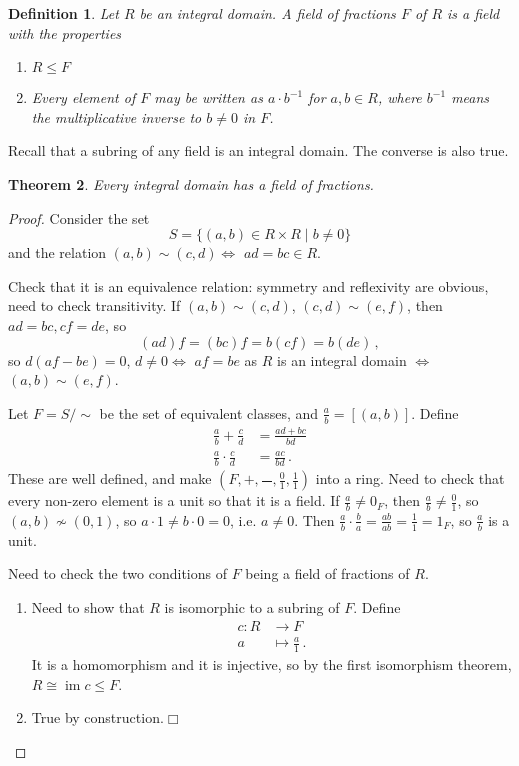 \documentclass{article}
\theoremstyle{plain}\theoremheaderfont{\normalfont\itshape}\theorembodyfont{\rmfamily}\theoremseparator{.}\newtheorem*{rem}{Remark}\newtheorem*{ex}{Example}\newtheorem*{proof}{Proof}\newtheorem*{altp}{Alternative proof}\newtheorem*{nonex}{Non-Example}
\theoremstyle{plain}\theoremheaderfont{\normalfont\bfseries}\theorembodyfont{\rmfamily}\theoremseparator{.}\newtheorem{thm}{Theorem}[section]\newtheorem{lem}[thm]{Lemma}\newtheorem{prop}[thm]{Proposition}\newtheorem*{cor}{Corollary}\newtheorem{defn}[thm]{Definition}\newtheorem{clm}[thm]{Claim}\newtheorem{clminproof}{Claim}\newtheorem*{notn}{Notation}\newtheorem*{exer}{Exercise}\newtheorem*{lemnn}{Lemma}
\theoremstyle{break}\theoremheaderfont{\normalfont\itshape}\theorembodyfont{\rmfamily}\theoremseparator{.\medskip}\newtheorem*{proofskip}{Proof}\newtheorem*{exs}{Examples}\newtheorem*{rems}{Remarks}\newtheorem*{obs}{Observations}
\theoremstyle{break}\theoremheaderfont{\normalfont\bfseries}\theorembodyfont{\rmfamily}\theoremseparator{.\medskip}\newtheorem{lemskip}[thm]{Lemma}\newtheorem{defnskip}[thm]{Definition}\newtheorem{propskip}[thm]{Proposition}\newtheorem{thmskip}[thm]{Theorem}
\numberwithin{equation}{section}
\newcommand{\qed}{\hfill\ensuremath{\Box}}
\DeclareMathOperator*{\im}{im}
\begin{document}
    \begin{defn}
        Let \(R\) be an integral domain. A \textit{field of fractions} \(F\) of \(R\) is a field with the properties
        \begin{enumerate}[topsep=0pt,label=(\roman*)]
            \item \(R\le F\)
            \item Every element of \(F\) may be written as \(a\cdot b^{-1}\) for \(a,b\in R\), where \(b^{-1}\) means the multiplicative inverse to \(b\ne 0\) in \(F\).
        \end{enumerate}
    \end{defn}

    Recall that a subring of any field is an integral domain. The converse is also true.
    \begin{thm}
        Every integral domain has a field of fractions.
    \end{thm}
    \begin{proof}
        Consider the set
        \[S=\{(a,b)\in R\times R\mid b\ne 0\}\]
        and the relation \((a,b)\sim(c,d)\iff\) \(ad=bc\in R\).

        Check that it is an equivalence relation: symmetry and reflexivity are obvious, need to check transitivity. If \((a,b)\sim(c,d)\), \((c,d)\sim(e,f)\), then \(ad=bc,cf=de\), so
        \[(ad)f=(bc)f=b(cf)=b(de)\,,\]
        so \(d(af-be)=0\), \(d\ne 0\iff\) \(af=be\) as \(R\) is an integral domain \(\iff\) \((a,b)\sim (e,f)\).

        Let \(F=S/\sim\) be the set of equivalent classes, and \(\frac{a}{b}=[(a,b)]\). Define
        \begin{align*}
            \frac{a}{b}+\frac{c}{d}&=\frac{ad+bc}{bd}\\
            \frac{a}{b}\cdot\frac{c}{d}&=\frac{ac}{bd}\,.
        \end{align*}
        These are well defined, and make \((F,+,\frac{\quad}{\quad},\frac{0}{1},\frac{1}{1})\) into a ring. Need to check that every non-zero element is a unit so that it is a field. If \(\frac{a}{b}\ne 0_F\), then \(\frac{a}{b}\ne\frac{0}{1}\), so \((a,b)\not\sim (0,1)\), so \(a\cdot 1\ne b\cdot 0=0\), i.e. \(a\ne 0\). Then \(\frac{a}{b}\cdot\frac{b}{a}=\frac{ab}{ab}=\frac{1}{1}=1_F\), so \(\frac{a}{b}\) is a unit.

        Need to check the two conditions of \(F\) being a field of fractions of \(R\).
        \begin{enumerate}[topsep=0pt,label=(\roman*)]
            \item Need to show that \(R\) is isomorphic to a subring of \(F\). Define
            \begin{align*}
                c:R&\longrightarrow F\\
                a&\longmapsto \frac{a}{1}\,.
            \end{align*}
            It is a homomorphism and it is injective, so by the first isomorphism theorem,\(R\cong\im c\le F\).
            \item True by construction.\qed
        \end{enumerate}
    \end{proof}
\end{document}
